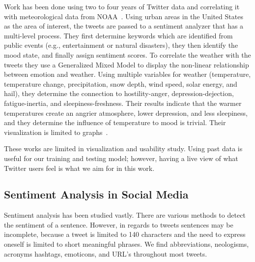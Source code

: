 Work has been done using two to four years of Twitter data and correlating it with meteorological data from NOAA~\cite{hannak2012tweetin,keller2005warm}. Using urban areas in the United States as the area of interest, the tweets are passed to a sentiment analyzer that has a multi-level process. They first determine keywords which are identified from public events (e.g., entertainment or natural disasters), they then identify the mood state, and finally assign sentiment scores. To correlate the weather with the tweets they use a Generalized Mixed Model to display the non-linear relationship between emotion and weather. Using multiple variables for weather (temperature, temperature change, precipitation, snow depth, wind speed, solar energy, and hail), they determine the connection to hostility-anger, depression-dejection, fatigue-inertia, and sleepiness-freshness. Their results indicate that the warmer temperatures create an angrier atmosphere, lower depression, and less sleepiness, and they determine the influence of temperature to mood is trivial. Their visualization is limited to graphs~\cite{hannak2012tweetin}. ~

These works are limited in visualization and usability study. Using past data is useful for our training and testing model; however, having a live view of what Twitter users feel is what we aim for in this work.


\subsection{Sentiment Analysis in Social Media}

Sentiment analysis has been studied vastly. There are various methods to detect the sentiment of a sentence. However, in regards to tweets sentences may be incomplete, because a tweet is limited to 140 characters and the need to express oneself is limited to short meaningful phrases. We find abbreviations, neologisms, acronyms hashtags, emoticons, and URL's throughout most tweets.

